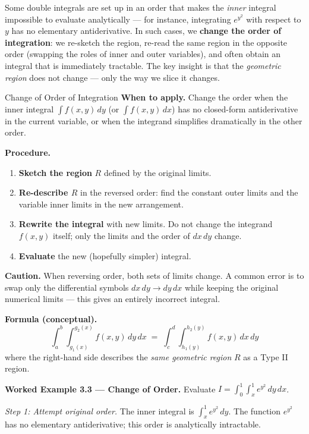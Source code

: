 \documentclass[12pt,a4paper]{article}
\begin{document}
Some double integrals are set up in an order that makes the \emph{inner} integral impossible to evaluate analytically --- for instance, integrating \(e^{y^2}\) with respect to \(y\) has no elementary antiderivative. In such cases, we \textbf{change the order of integration}: we re-sketch the region, re-read the same region in the opposite order (swapping the roles of inner and outer variables), and often obtain an integral that is immediately tractable. The key insight is that the \emph{geometric region} does not change --- only the way we slice it changes.

\begin{infobox}{Change of Order of Integration}
\textbf{When to apply.} Change the order when the inner integral \(\int f(x,y)\,dy\) (or \(\int f(x,y)\,dx\)) has no closed-form antiderivative in the current variable, or when the integrand simplifies dramatically in the other order.

\textbf{Procedure.}
\begin{enumerate}[nosep]
  \item \textbf{Sketch the region} \(R\) defined by the original limits.
  \item \textbf{Re-describe \(R\)} in the reversed order: find the constant outer limits and the variable inner limits in the new arrangement.
  \item \textbf{Rewrite the integral} with new limits. Do not change the integrand \(f(x,y)\) itself; only the limits and the order of \(dx\,dy\) change.
  \item \textbf{Evaluate} the new (hopefully simpler) integral.
\end{enumerate}

\textbf{Caution.} When reversing order, both sets of limits change. A common error is to swap only the differential symbols \(dx\,dy \to dy\,dx\) while keeping the original numerical limits --- this gives an entirely incorrect integral.

\textbf{Formula (conceptual).}
\[
  \int_a^b \int_{g_1(x)}^{g_2(x)} f(x,y)\,dy\,dx
  \;=\;
  \int_c^d \int_{h_1(y)}^{h_2(y)} f(x,y)\,dx\,dy
\]
where the right-hand side describes the \emph{same geometric region} \(R\) as a Type II region.
\end{infobox}

\textbf{Worked Example 3.3 --- Change of Order.}
Evaluate \(\displaystyle I = \int_0^1 \int_x^1 e^{y^2}\,dy\,dx\).

\textit{Step 1: Attempt original order.} The inner integral is \(\int_x^1 e^{y^2}\,dy\). The function \(e^{y^2}\) has no elementary antiderivative; this order is analytically intractable.
\end{document}
